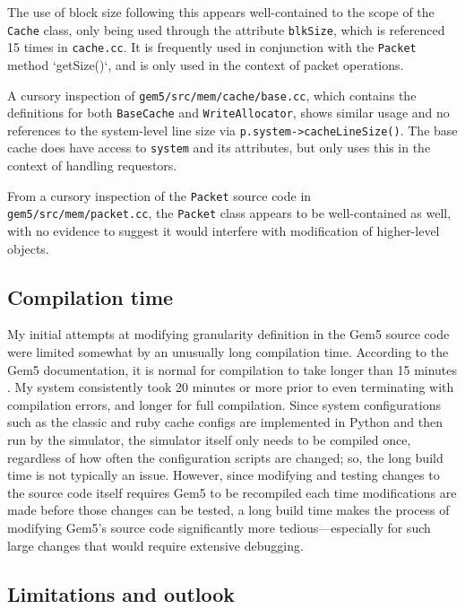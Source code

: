 \documentclass[12pt,twoside]{reedthesis}
\begin{document}
	The use of block size following this appears well-contained to the scope of the \verb`Cache` class, only being used through the attribute \verb`blkSize`, which is referenced 15 times in \verb`cache.cc`. It is frequently used in conjunction with the \verb`Packet` method `getSize()`, and is only used in the context of packet operations.
	
	A cursory inspection of \verb`gem5/src/mem/cache/base.cc`, which contains the definitions for both \verb`BaseCache` and \verb`WriteAllocator`, shows similar usage and no references to the system-level line size via \verb`p.system->cacheLineSize()`. The base cache does have access to \verb`system` and its attributes, but only uses this in the context of handling requestors.
	
	From a cursory inspection of the \verb`Packet` source code in \verb`gem5/src/mem/packet.cc`, the \verb`Packet` class appears to be well-contained as well, with no evidence to suggest it would interfere with modification of higher-level objects.

	\subsection*{Compilation time}

	My initial attempts at modifying granularity definition in the Gem5 source code were limited somewhat by an unusually long compilation time. According to the Gem5 documentation, it is normal for compilation to take longer than 15 minutes \cite{gem5-build}. My system consistently took 20 minutes or more prior to even terminating with compilation errors, and longer for full compilation. Since system configurations such as the classic and ruby cache configs are implemented in Python and then run by the simulator, the simulator itself only needs to be compiled once, regardless of how often the configuration scripts are changed; so, the long build time is not typically an issue. However, since modifying and testing changes to the source code itself requires Gem5 to be recompiled each time modifications are made before those changes can be tested, a long build time makes the process of modifying Gem5's source code significantly more tedious---especially for such large changes that would require extensive debugging.

	\subsection*{Limitations and outlook}
\end{document}
